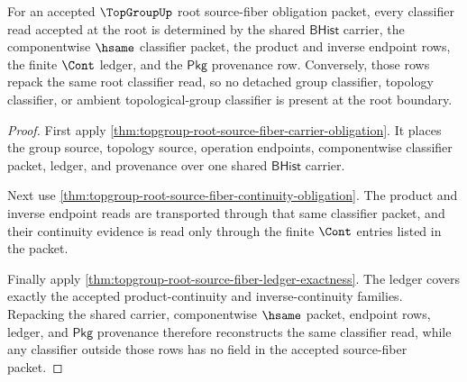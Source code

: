 \begin{theorem}
\label{thm:topgroup-root-source-fiber-classifier-determinacy}
For an accepted $\TopGroupUp$ root source-fiber obligation packet, every
classifier read accepted at the root is determined by the shared
$\mathsf{BHist}$ carrier, the componentwise $\hsame$ classifier packet, the
product and inverse endpoint rows, the finite $\Cont$ ledger, and the
$\mathsf{Pkg}$ provenance row. Conversely, those rows repack the same root
classifier read, so no detached group classifier, topology classifier, or
ambient topological-group classifier is present at the root boundary.
\end{theorem}
\begin{proof}
First apply
\autoref{thm:topgroup-root-source-fiber-carrier-obligation}. It places the
group source, topology source, operation endpoints, componentwise classifier
packet, ledger, and provenance over one shared $\mathsf{BHist}$ carrier.

Next use
\autoref{thm:topgroup-root-source-fiber-continuity-obligation}. The product
and inverse endpoint reads are transported through that same classifier
packet, and their continuity evidence is read only through the finite
$\Cont$ entries listed in the packet.

Finally apply
\autoref{thm:topgroup-root-source-fiber-ledger-exactness}. The ledger covers
exactly the accepted product-continuity and inverse-continuity families.
Repacking the shared carrier, componentwise $\hsame$ packet, endpoint rows,
ledger, and $\mathsf{Pkg}$ provenance therefore reconstructs the same
classifier read, while any classifier outside those rows has no field in the
accepted source-fiber packet.
\end{proof}

